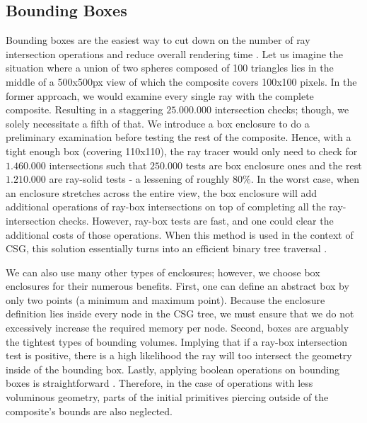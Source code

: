 \documentclass[a4paper,11pt,oneside]{article}
\begin{document}
\subsection{Bounding Boxes}
\label{section:bounding-boxes-optimization}

Bounding boxes are the easiest way to cut down on the number of ray intersection operations and reduce overall rendering time \cite{efficient_csg_meshes}. Let us imagine the situation where a union of two spheres composed of 100 triangles lies in the middle of a 500x500px view of which the composite covers 100x100 pixels. In the former approach, we would examine every single ray with the complete composite. Resulting in a staggering $25.000.000$ intersection checks; though,  we solely necessitate a fifth of that. We introduce a box enclosure to do a preliminary examination before testing the rest of the composite. Hence, with a tight enough box (covering 110x110), the ray tracer would only need to check for $1.460.000$ intersections such that $250.000$ tests are box enclosure ones and the rest $1.210.000$ are ray-solid tests - a lessening of roughly $80\%$. In the worst case, when an enclosure stretches across the entire view, the box enclosure will add additional operations of ray-box intersections on top of completing all the ray-intersection checks. However, ray-box tests are fast, and one could clear the additional costs of those operations. When this method is used in the context of CSG, this solution essentially turns into an efficient binary tree traversal \cite{ROTH1982109}. 

We can also use many other types of enclosures; however, we choose box enclosures for their numerous benefits. First, one can define an abstract box by only two points (a minimum and maximum point). Because the enclosure definition lies inside every node in the CSG tree, we must ensure that we do not excessively increase the required memory per node. Second, boxes are arguably the tightest types of bounding volumes. Implying that if a ray-box intersection test is positive, there is a high likelihood the ray will too intersect the geometry inside of the bounding box. Lastly, applying boolean operations on bounding boxes is straightforward \cite{ROTH1982109}. Therefore, in the case of operations with less voluminous geometry, parts of the initial primitives piercing outside of the composite's bounds are also neglected.
\end{document}
